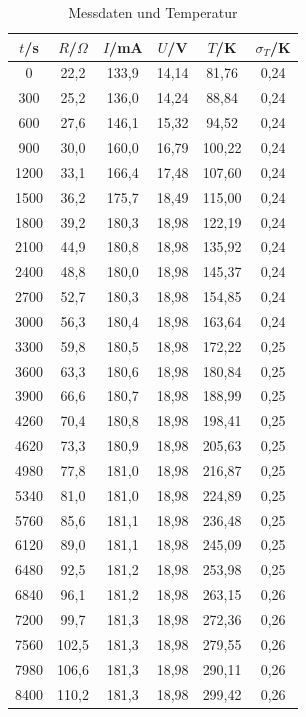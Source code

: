 \begin{table}[H]
	\begin{center}
		\begin{tabular}{c c c c c c}
			\toprule
			\(t\)/s & \(R\)/\(\Omega\) & \(I\)/mA & \(U\)/V & \(T\)/K & \(\sigma_T\)/K\\
			\midrule
			0		&22,2		&133,9	&14,14	&81,76	&0,24 \\
			300		&25,2		&136,0	&14,24	&88,84	&0,24 \\
			600		&27,6		&146,1	&15,32	&94,52	&0,24 \\
			900		&30,0		&160,0	&16,79	&100,22	&0,24 \\
			1200	&33,1		&166,4	&17,48	&107,60	&0,24 \\
			1500	&36,2		&175,7	&18,49	&115,00	&0,24 \\
			1800	&39,2		&180,3	&18,98	&122,19	&0,24 \\
			2100	&44,9		&180,8	&18,98	&135,92	&0,24 \\
			2400	&48,8		&180,0	&18,98	&145,37	&0,24 \\
			2700	&52,7		&180,3	&18,98	&154,85	&0,24 \\
			3000	&56,3		&180,4	&18,98	&163,64	&0,24 \\
			3300	&59,8		&180,5	&18,98	&172,22	&0,25 \\
			3600	&63,3		&180,6	&18,98	&180,84	&0,25 \\
			3900	&66,6		&180,7	&18,98	&188,99	&0,25 \\
			4260	&70,4		&180,8	&18,98	&198,41	&0,25 \\
			4620	&73,3		&180,9	&18,98	&205,63	&0,25 \\
			4980	&77,8		&181,0	&18,98	&216,87	&0,25 \\
			5340	&81,0		&181,0	&18,98	&224,89	&0,25 \\
			5760	&85,6		&181,1	&18,98	&236,48	&0,25 \\
			6120	&89,0		&181,1	&18,98	&245,09	&0,25 \\
			6480	&92,5		&181,2	&18,98	&253,98	&0,25 \\
			6840	&96,1		&181,2	&18,98	&263,15	&0,26 \\
			7200	&99,7		&181,3	&18,98	&272,36	&0,26 \\
			7560	&102,5		&181,3	&18,98	&279,55	&0,26 \\
			7980	&106,6		&181,3	&18,98	&290,11	&0,26 \\
			8400	&110,2		&181,3	&18,98	&299,42	&0,26 \\
			\bottomrule
		\end{tabular}
		\caption{Messdaten und Temperatur}
		\label{fig:tab1}
	\end{center}
\end{table}

